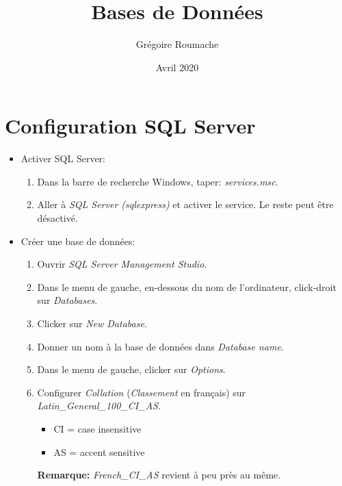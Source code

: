 \documentclass[a4paper]{article}
\title{Bases de Données}
\author{Grégoire Roumache}
\date{Avril 2020}
\begin{document}
\maketitle















\section{Configuration SQL Server}





\begin{itemize}





\item Activer SQL Server:
\begin{enumerate}
    \item Dans la barre de recherche Windows, taper: \textit{services.msc}.
    \item Aller à \textit{SQL Server (sqlexpress)} et activer le service. Le reste peut être désactivé.
\end{enumerate}





\item Créer une base de données:
\begin{enumerate}
    \item Ouvrir \textit{SQL Server Management Studio}.
    \item Dans le menu de gauche, en-dessous du nom de l'ordinateur, click-droit sur \textit{Databases}.
    \item Clicker sur \textit{New Database}.
    \item Donner un nom à la base de données dans \textit{Database name}.
    \item Dans le menu de gauche, clicker sur \textit{Options}.
    \item Configurer \textit{Collation} (\textit{Classement} en français) sur \textit{Latin\_General\_100\_CI\_AS}.
    \begin{example}
        \begin{itemize}
            \item CI = case insensitive
            \item AS = accent sensitive
        \end{itemize}
        \textbf{Remarque:} \textit{French\_CI\_AS} revient à peu près au même.
    \end{example}
\end{enumerate}





\end{itemize}
\end{document}
